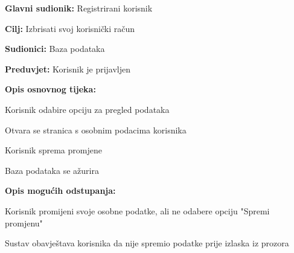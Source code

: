 				\noindent {}
					\begin{packed_item}
	
						\item \textbf{Glavni sudionik: }Registrirani korisnik
						\item  \textbf{Cilj:} Izbrisati svoj korisnički račun
						\item  \textbf{Sudionici:} Baza podataka
						\item  \textbf{Preduvjet:} Korisnik je prijavljen
						\item  \textbf{Opis osnovnog tijeka:}
						
						\item[] \begin{packed_enum}
	
							\item Korisnik odabire opciju za pregled podataka
							\item Otvara se stranica s osobnim podacima korisnika
							\item Korisnik sprema promjene
							\item Baza podataka se ažurira

						\end{packed_enum}
						
						\item  \textbf{Opis mogućih odstupanja:}
						
						\item[] \begin{packed_item}
	
							\item[2.a] Korisnik promijeni svoje osobne podatke, ali ne odabere opciju "Spremi promjenu"
							
								\begin{packed_item}
									\item Sustav obavještava korisnika da nije spremio podatke prije izlaska iz prozora
								\end{packed_item}
							
						\end{packed_item}						
					\end{packed_item}
					
